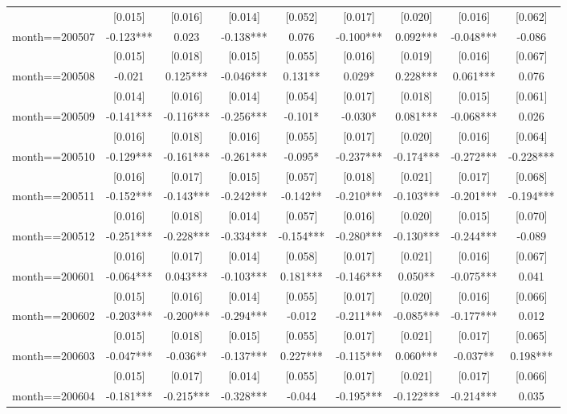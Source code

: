 \documentclass[]{article}
\begin{document}
\begin{tabular}{lcccccccc}
 & [0.015] & [0.016] & [0.014] & [0.052] & [0.017] & [0.020] & [0.016] & [0.062] \\
month==200507 & -0.123*** & 0.023 & -0.138*** & 0.076 & -0.100*** & 0.092*** & -0.048*** & -0.086 \\
 & [0.015] & [0.018] & [0.015] & [0.055] & [0.016] & [0.019] & [0.016] & [0.067] \\
month==200508 & -0.021 & 0.125*** & -0.046*** & 0.131** & 0.029* & 0.228*** & 0.061*** & 0.076 \\
 & [0.014] & [0.016] & [0.014] & [0.054] & [0.017] & [0.018] & [0.015] & [0.061] \\
month==200509 & -0.141*** & -0.116*** & -0.256*** & -0.101* & -0.030* & 0.081*** & -0.068*** & 0.026 \\
 & [0.016] & [0.018] & [0.016] & [0.055] & [0.017] & [0.020] & [0.016] & [0.064] \\
month==200510 & -0.129*** & -0.161*** & -0.261*** & -0.095* & -0.237*** & -0.174*** & -0.272*** & -0.228*** \\
 & [0.016] & [0.017] & [0.015] & [0.057] & [0.018] & [0.021] & [0.017] & [0.068] \\
month==200511 & -0.152*** & -0.143*** & -0.242*** & -0.142** & -0.210*** & -0.103*** & -0.201*** & -0.194*** \\
 & [0.016] & [0.018] & [0.014] & [0.057] & [0.016] & [0.020] & [0.015] & [0.070] \\
month==200512 & -0.251*** & -0.228*** & -0.334*** & -0.154*** & -0.280*** & -0.130*** & -0.244*** & -0.089 \\
 & [0.016] & [0.017] & [0.014] & [0.058] & [0.017] & [0.021] & [0.016] & [0.067] \\
month==200601 & -0.064*** & 0.043*** & -0.103*** & 0.181*** & -0.146*** & 0.050** & -0.075*** & 0.041 \\
 & [0.015] & [0.016] & [0.014] & [0.055] & [0.017] & [0.020] & [0.016] & [0.066] \\
month==200602 & -0.203*** & -0.200*** & -0.294*** & -0.012 & -0.211*** & -0.085*** & -0.177*** & 0.012 \\
 & [0.015] & [0.018] & [0.015] & [0.055] & [0.017] & [0.021] & [0.017] & [0.065] \\
month==200603 & -0.047*** & -0.036** & -0.137*** & 0.227*** & -0.115*** & 0.060*** & -0.037** & 0.198*** \\
 & [0.015] & [0.017] & [0.014] & [0.055] & [0.017] & [0.021] & [0.017] & [0.066] \\
month==200604 & -0.181*** & -0.215*** & -0.328*** & -0.044 & -0.195*** & -0.122*** & -0.214*** & 0.035 \\

\end{tabular}
\end{document}
